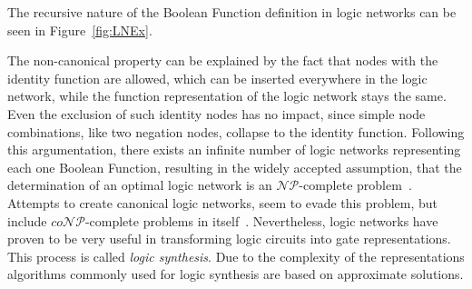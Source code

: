 The recursive nature of the Boolean Function definition in logic networks can be seen in Figure~\ref{fig:LNEx}.

The non-canonical property can be explained by the fact that nodes with the identity function are allowed, which can be inserted everywhere in the logic network, while the function representation of the logic network stays the same. Even the exclusion of such identity nodes has no impact, since simple node combinations, like two negation nodes, collapse to the identity function. Following this argumentation, there exists an infinite number of logic networks representing each one Boolean Function, resulting in the widely accepted assumption, that the determination of an optimal logic network is an $\mathcal{NP}$-complete problem~\cite{Walter}. Attempts to create canonical logic networks, seem to evade this problem, but include $co\mathcal{NP}$-complete problems in itself~\cite{LogicNetwork}.
Nevertheless, logic networks have proven to be very useful in transforming logic circuits into gate representations. This process is called \textit{logic synthesis}. Due to the complexity of the representations algorithms commonly used for logic synthesis are based on approximate solutions.




